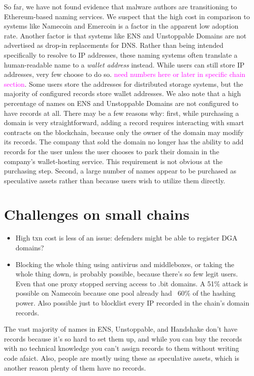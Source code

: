 \documentclass[10pt,sigconf,letterpaper]{acmart}
\newcommand{\randall}{\ding{110}\ding{43}\textcolor{magenta}}
\newcommand{\randall}{}
\begin{document}
So far, we have not found evidence that malware authors are 
transitioning to Ethereum-based naming services. We suspect that the high cost in 
comparison to systems like Namecoin and Emercoin is a factor in the apparent low adoption rate. 
Another factor is that systems like ENS and Unstoppable Domains are not advertised as drop-in 
replacements for DNS. Rather than being intended specifically to resolve to IP addresses, these 
naming systems often translate a human-readable name to a \emph{wallet address} instead. While 
users can still store IP addresses, very few choose to do so. \randall{need numbers here or later 
in specific chain section}. Some users store the addresses for distributed storage systems, but the 
majority of configured records store wallet addresses. We also note that a high percentage of names 
on ENS and Unstoppable Domains are not configured to have records at all. There may be a few 
reasons why: first, while purchasing a domain is very straightforward, adding a record requires 
interacting with smart contracts on the blockchain, because only the owner of the domain may modify 
its records. The company that sold the domain no longer has the ability to add records for the user 
unless the user chooses to park their domain in the company's wallet-hosting service. This 
requirement is not obvious at the purchasing step. Second, a large number of names appear to be 
purchased as speculative assets rather than because users wish to utilize them directly. 

\section{Challenges on small chains}
\begin{itemize}
	\item High txn cost is less of an issue: defenders might 
	be able to register DGA domains? 
	\item Blocking the whole thing using antivirus and 
	middleboxes, or taking the whole thing down, is probably 
	possible, because there's so few legit users. Even that 
	one proxy stopped serving access to .bit domains. A 51\% 
	attack is possible on Namecoin because one pool already 
	had ~60\% of the hashing power. Also possible just to 
	blocklist every IP recorded in the chain's domain records.
\end{itemize}

The vast majority of names in ENS, Unstoppable, and Handshake 
don't have records because it's so hard to set them up, and 
while you can buy the records with no technical knowledge you 
can't assign records to them without writing code afaict. 
Also, people are mostly using these as speculative assets, 
which is another reason plenty of them have no records.
\end{document}
